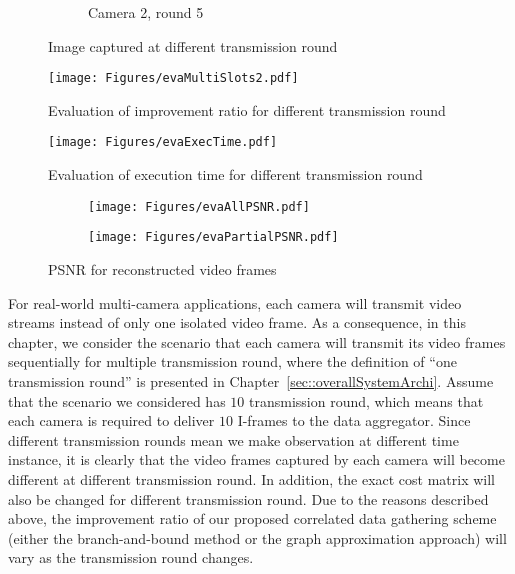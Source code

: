 {{\begin{figure}
\begin{center}
\begin{subfigure}[b]{0.4\columnwidth}
\caption{Camera 2, round 5}
\end{subfigure}
\caption{\label{fig::imgCapMultiSlots} Image captured at different transmission round}
\end{center}
\end{figure}
} %
%
\begin{figure}
\begin{center}
\texttt{[image: Figures/evaMultiSlots2.pdf]}
\caption{\label{fig::evaMultiSlots}Evaluation of improvement ratio for different transmission round}
\end{center}
\end{figure}
%
\begin{figure}
\begin{center}
\texttt{[image: Figures/evaExecTime.pdf]}
\caption{\label{fig::evaExecTime}Evaluation of execution time for different transmission round}
\end{center}
\end{figure}
%
\begin{figure}
\begin{center}
\begin{subfigure}[b]{\columnwidth}
\texttt{[image: Figures/evaAllPSNR.pdf]}
\caption{\label{fig::evaAllPSNR}}
\end{subfigure}
\begin{subfigure}[b]{\columnwidth}
\texttt{[image: Figures/evaPartialPSNR.pdf]}
\caption{\label{fig::evaPartialPSNR}}
\end{subfigure}
\caption{\label{fig::evaMultiRunPSNR} PSNR for reconstructed video frames}
\end{center}
\end{figure}
%
For real-world multi-camera applications, each camera will transmit video streams instead of only one isolated video frame.
As a consequence, in this chapter, we consider the scenario that each camera will transmit its video frames sequentially for multiple transmission round, where the definition of ``one transmission round'' is presented in Chapter~\ref{sec::overallSystemArchi}.
Assume that the scenario we considered has $10$ transmission round, which means that each camera is required to deliver $10$ I-frames to the data aggregator.
Since different transmission rounds mean we make observation at different time instance, it is clearly that the video frames captured by each camera will become different at different transmission round.
In addition, the exact cost matrix will also be changed for different transmission round.
Due to the reasons described above, the improvement ratio of our proposed correlated data gathering scheme (either the branch-and-bound method or the graph approximation approach) will vary as the transmission round changes.

}
